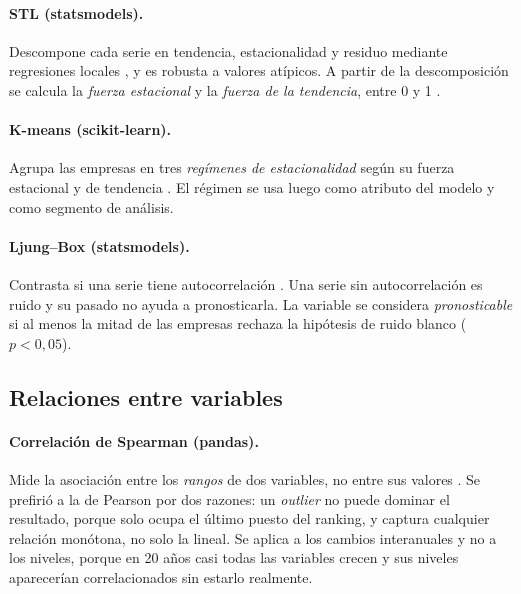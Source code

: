 \documentclass[12pt,letterpaper,oneside]{report}
\renewcommand{\_}{\UnderscoreOriginal\allowbreak}
\begin{document}
\paragraph{STL (statsmodels).} Descompone cada serie en tendencia, estacionalidad y residuo mediante regresiones locales \parencite{cleveland1990stl}, y es robusta a valores atípicos. A partir de la descomposición se calcula la \emph{fuerza estacional} y la \emph{fuerza de la tendencia}, entre 0 y 1 \parencite{wang2006characteristic}.

\paragraph{K-means (scikit-learn).} Agrupa las empresas en tres \emph{regímenes de estacionalidad} según su fuerza estacional y de tendencia \parencite{lloyd1982least}. El régimen se usa luego como atributo del modelo y como segmento de análisis.

\paragraph{Ljung--Box (statsmodels).} Contrasta si una serie tiene autocorrelación \parencite{ljung1978measure}. Una serie sin autocorrelación es ruido y su pasado no ayuda a pronosticarla. La variable se considera \emph{pronosticable} si al menos la mitad de las empresas rechaza la hipótesis de ruido blanco ($p < 0{,}05$).

\subsection{Relaciones entre variables}

\paragraph{Correlación de Spearman (pandas).} Mide la asociación entre los \emph{rangos} de dos variables, no entre sus valores \parencite{spearman1904proof}. Se prefirió a la de Pearson por dos razones: un \textit{outlier} no puede dominar el resultado, porque solo ocupa el último puesto del ranking, y captura cualquier relación monótona, no solo la lineal. Se aplica a los cambios interanuales y no a los niveles, porque en 20 años casi todas las variables crecen y sus niveles aparecerían correlacionados sin estarlo realmente.
\end{document}
